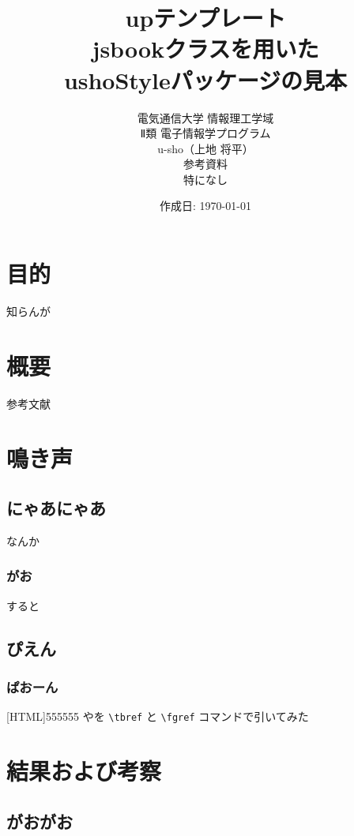 \documentclass[uplatex,dvipdfmx,11pt]{jsbook}
\title{
  {\normalsize up\LaTeXe テンプレート}%
  \\[10truemm]
  jsbookクラスを用いた\\
  ushoStyleパッケージの見本
  \vspace{30truemm}
}
\author{
  \large{電気通信大学 情報理工学域}\\
  \large{Ⅱ類 電子情報学プログラム}
  \\[10truemm]
  u-sho（上地 将平）
  \\[20truemm]
  参考資料
  \\[5truemm]
  特になし
  \vspace{20truemm}
}
\date{作成日: \和暦\today}
\begin{document}
  \maketitle
  \tableofcontents

  \chapter{目的}%
    知らんが

  \chapter{概要}%
    参考文献~\cite{キー1}

  \chapter{鳴き声} %

    \section{にゃあにゃあ}
      なんか

      \subsection{がお}
        すると

    \section{ぴえん} %

      \subsection{ぱおーん}

        [HTML]{555555}{}
        やを \verb|\tbref| と \verb|\fgref| コマンドで引いてみた

  \newpage

  \chapter{結果および考察}

    \section{がおがお}
\end{document}
